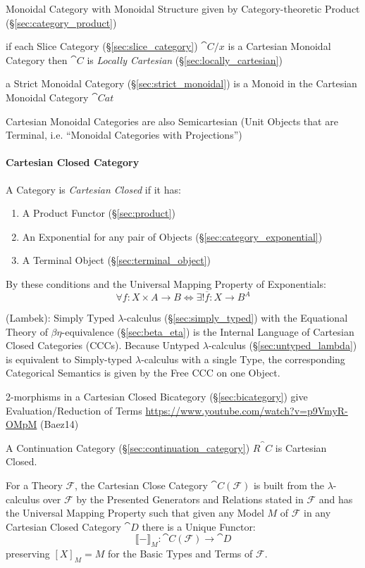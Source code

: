 Monoidal Category with Monoidal Structure given by Category-theoretic Product
(\S\ref{sec:category_product})

if each Slice Category (\S\ref{sec:slice_category}) $\cat{C}/x$ is a
Cartesian Monoidal Category then $\cat{C}$ is \emph{Locally Cartesian}
(\S\ref{sec:locally_cartesian})

a Strict Monoidal Category (\S\ref{sec:strict_monoidal}) is a Monoid
in the Cartesian Monoidal Category $\cat{Cat}$

Cartesian Monoidal Categories are also Semicartesian (Unit Objects
that are Terminal, i.e. ``Monoidal Categories with Projections'')



\paragraph{Cartesian Closed Category}\label{sec:cartesian_closed}\hfill

A Category is \emph{Cartesian Closed} if it has:
\begin{enumerate}
  \item A Product Functor (\S\ref{sec:product})
  \item An Exponential for any pair of Objects
    (\S\ref{sec:category_exponential})
  \item A Terminal Object (\S\ref{sec:terminal_object})
\end{enumerate}
By these conditions and the Universal Mapping Property of
Exponentials:
\[
  \forall f : X \times A \rightarrow B \Leftrightarrow
  \exists ! \overline{f} : X \rightarrow B^A
\]

(Lambek): Simply Typed $\lambda$-calculus (\S\ref{sec:simply_typed}) with the
Equational Theory of $\beta\eta$-equivalence (\S\ref{sec:beta_eta}) is the
Internal Language of Cartesian Closed Categories (CCCs). Because Untyped
$\lambda$-calculus (\S\ref{sec:untyped_lambda}) is equivalent to Simply-typed
$\lambda$-calculus with a single Type, the corresponding Categorical Semantics
is given by the Free CCC on one Object.

2-morphisms in a Cartesian Closed Bicategory (\S\ref{sec:bicategory})
give Evaluation/Reduction of Terms
\url{https://www.youtube.com/watch?v=p9VmyR-OMpM} (Baez14)

A Continuation Category (\S\ref{sec:continuation_category})
$R^\cat{C}$ is Cartesian Closed.

For a Theory $\mathcal{F}$, the Cartesian Close Category
$\cat{C}(\mathcal{F})$ is built from the $\lambda$-calculus over
$\mathcal{F}$ by the Presented Generators and Relations stated in
$\mathcal{F}$ and has the Universal Mapping Property such that given
any Model $M$ of $\mathcal{F}$ in any Cartesian Closed Category
$\cat{D}$ there is a Unique Functor:
\[
  \llbracket - \rrbracket_M :
    \cat{C}(\mathcal{F}) \rightarrow \cat{D}
\]
preserving $[X]_M = M$ for the Basic Types and Terms of $\mathcal{F}$.
\cite{awodey06}

